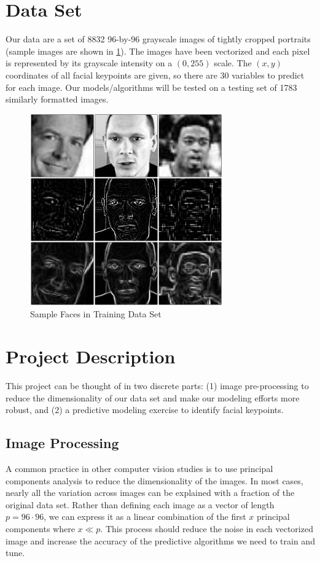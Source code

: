 \documentclass[conference]{IEEEtran}
\begin{document}
\section{Data Set}
Our data are a set of \num{8832} 96-by-96 grayscale images of tightly cropped portraits (sample images are shown in \cref{fig:sample_faces}). The images have been vectorized and each pixel is represented by its grayscale intensity on a $(0,255)$ scale. The $(x,y)$ coordinates of all facial keypoints are given, so there are 30 variables to predict for each image. Our models/algorithms will be tested on a testing set of \num{1783} similarly formatted images.
\begin{figure}[!ht]
    \centering
    \includegraphics[width=3.25in]{sample_faces.pdf}
    \caption{Sample Faces in Training Data Set}
    \label{fig:sample_faces}
\end{figure}

\section{Project Description}
This project can be thought of in two discrete parts: (1) image pre-processing to reduce the dimensionality of our data set and make our modeling efforts more robust, and (2) a predictive modeling exercise to identify facial keypoints.

\subsection{Image Processing}
A common practice in other computer vision studies is to use principal components analysis to reduce the dimensionality of the images. In most cases, nearly all the variation across images can be explained with a fraction of the original data set. Rather than defining each image as a vector of length $p=96\cdot96$, we can express it as a linear combination of the first $x$ principal components where $x \ll p$. This process should reduce the noise in each vectorized image and increase the accuracy of the predictive algorithms we need to train and tune.
\end{document}
